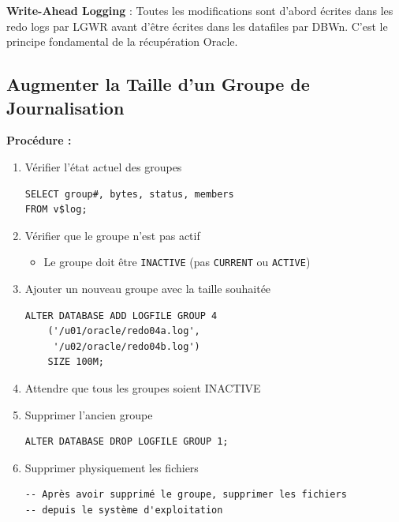 \documentclass[11pt,a4paper]{article}
\begin{document}
\begin{importantbox}
\textbf{Write-Ahead Logging} : Toutes les modifications sont d'abord écrites dans les redo logs par LGWR avant d'être écrites dans les datafiles par DBWn. C'est le principe fondamental de la récupération Oracle.
\end{importantbox}

\subsection{Augmenter la Taille d'un Groupe de Journalisation}

\textbf{Procédure :}

\begin{enumerate}
    \item Vérifier l'état actuel des groupes
    \begin{commandebox}
\begin{lstlisting}
SELECT group#, bytes, status, members 
FROM v$log;
\end{lstlisting}
    \end{commandebox}
    
    \item Vérifier que le groupe n'est pas actif
    \begin{itemize}
        \item Le groupe doit être \texttt{INACTIVE} (pas \texttt{CURRENT} ou \texttt{ACTIVE})
    \end{itemize}
    
    \item Ajouter un nouveau groupe avec la taille souhaitée
    \begin{commandebox}
\begin{lstlisting}
ALTER DATABASE ADD LOGFILE GROUP 4 
    ('/u01/oracle/redo04a.log',
     '/u02/oracle/redo04b.log') 
    SIZE 100M;
\end{lstlisting}
    \end{commandebox}
    
    \item Attendre que tous les groupes soient INACTIVE
    \item Supprimer l'ancien groupe
    \begin{commandebox}
\begin{lstlisting}
ALTER DATABASE DROP LOGFILE GROUP 1;
\end{lstlisting}
    \end{commandebox}
    
    \item Supprimer physiquement les fichiers
    \begin{commandebox}
\begin{lstlisting}
-- Après avoir supprimé le groupe, supprimer les fichiers
-- depuis le système d'exploitation
\end{lstlisting}
    \end{commandebox}
\end{enumerate}
\end{document}
